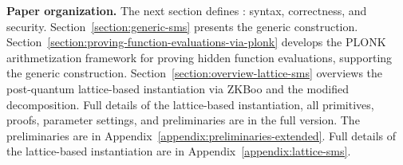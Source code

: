 \medskip
\noindent\textbf{Paper organization.}
The next section defines \SMS: syntax, correctness, and security.
Section~\ref{section:generic-sms} presents the generic construction.
Section~\ref{section:proving-function-evaluations-via-plonk} develops the
PLONK arithmetization framework for proving hidden function evaluations,
supporting the generic construction.
Section~\ref{section:overview-lattice-sms} overviews the post-quantum lattice-based instantiation via ZKBoo and the modified decomposition.
\ifcameraready
Full details of the lattice-based instantiation, all primitives, proofs,
parameter settings, and preliminaries are in the full version.
\else
The preliminaries are in Appendix~\ref{appendix:preliminaries-extended}.
Full details of the lattice-based instantiation are in Appendix~\ref{appendix:lattice-sms}.
\fi

